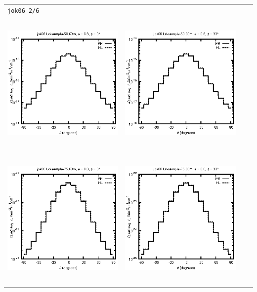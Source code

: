 \documentclass[10pt,a4paper]{article}
\begin{document}
\begin{adjustwidth}{-1.2in}{-1.2in}
\begin{tabular}{c c c c}
\multicolumn{4}{l}{\texttt{jok06 2/6}} \\
\includegraphics[height=7cm]{../eps/jok06_Ld_sample_50.00m_fwd.eps} &
\includegraphics[height=7cm]{../eps/jok06_Ld_sample_50.00m_cross.eps} \\
\includegraphics[height=7cm]{../eps/jok06_Ld_sample_75.00m_fwd.eps} &
\includegraphics[height=7cm]{../eps/jok06_Ld_sample_75.00m_cross.eps} \\

\end{tabular}
\end{adjustwidth}
\end{document}
